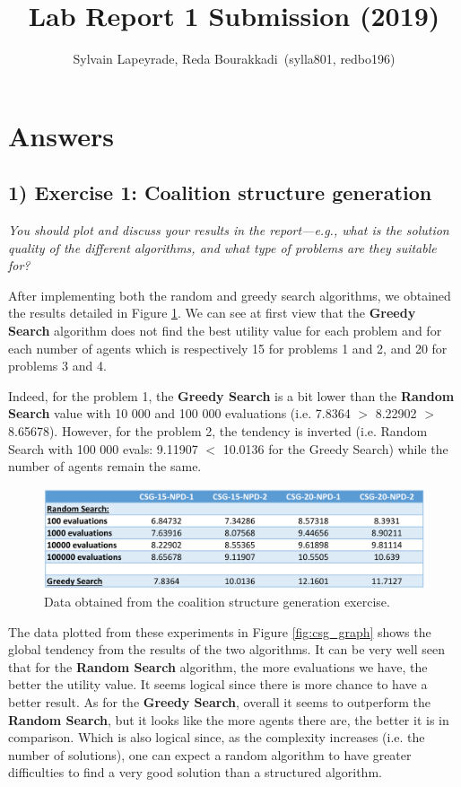 \documentclass[10pt]{article}
\title {Lab Report 1 Submission (2019)}
\author{Sylvain Lapeyrade, Reda Bourakkadi\, (sylla801, redbo196)}
\begin{document}
\maketitle

\section*{Answers}

\subsection*{1) \textbf{ Exercise 1: Coalition structure generation}}
\textit {You should plot and discuss your results in the report—e.g.,
 what is the solution quality of the different algorithms,
  and what type of problems are they suitable for?} \medskip

 After implementing both the random and greedy search algorithms, we obtained
  the results detailed in Figure \ref{fig:csg_data}. We can see at first view
  that the \textbf{Greedy Search} algorithm does not find the best utility value for each
  problem and for each number of agents which is respectively 15 for problems 1 and 2,
  and 20 for problems 3 and 4. \medskip

 Indeed, for the problem 1, the \textbf{Greedy Search} is a bit lower than the 
  \textbf{Random Search} value with 10 000 and 100 000 evaluations (i.e. 7.8364 $>$ 
  8.22902 $>$ 8.65678). However, for the problem 2, the tendency is inverted (i.e. Random
  Search with 100 000 evals: 9.11907 $<$ 10.0136 for the Greedy Search) while
  the number of agents remain the same.  

 \begin{figure}[ht!]
 \includegraphics[width=\linewidth]{csg_data.png}
 \caption{Data obtained from the coalition structure generation exercise.}
 \label{fig:csg_data}
 \end{figure}

 The data plotted from these experiments in Figure \ref{fig:csg_graph} shows the global
  tendency from the results of the two algorithms. It can be very well seen that for the
  \textbf{Random Search} algorithm, the more evaluations we have, the better the utility
  value. It seems logical since there is more chance to have a better result. As for the
  \textbf{Greedy Search}, overall it seems to outperform the \textbf{Random Search}, but
  it looks like the more agents there are, the better it is in comparison. Which is also
  logical since, as the complexity increases (i.e. the number of solutions), one can expect 
  a random algorithm to have greater difficulties to find a very good solution than a
  structured algorithm.
\end{document}

